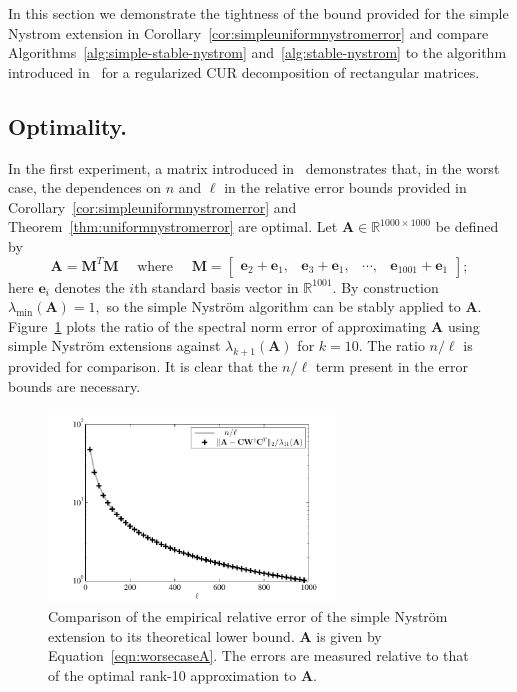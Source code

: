 \documentclass[11pt,letterpaper,twoside,reqno,nosumlimits]{amsart}
\def\transp{T}
\newcommand{\mat}[1]{\ensuremath{\mathbf{#1}}}
\renewcommand{\vec}[1]{\ensuremath{\mathbf{#1}}}
\newcommand{\R}{\ensuremath{\mathbb{R}}}
\newcommand{\lambdamin}[1]{\ensuremath{\lambda_{\mathrm{min}}\left(#1\right)}}
\theoremstyle{remark}
\begin{document}
In this section we demonstrate the tightness of the bound provided for the simple Nystrom extension in Corollary~\ref{cor:simpleuniformnystromerror} and compare Algorithms~\ref{alg:simple-stable-nystrom} and~\ref{alg:stable-nystrom} to the algorithm introduced in~\cite{CD11} for a regularized CUR decomposition of rectangular matrices. 

\subsection*{Optimality.}
In the first experiment, a matrix introduced in~\cite{BDM11} demonstrates that, in the worst case, the dependences on $n$ and $\ell$ in the relative error bounds provided in Corollary~\ref{cor:simpleuniformnystromerror} and Theorem~\ref{thm:uniformnystromerror} are optimal.
Let $\mat{A} \in \R^{1000 \times 1000}$ be defined by
\begin{equation}
\mat{A} = \mat{M}^\transp \mat{M} \quad \text{ where } \quad 
 \mat{M} = [\begin{matrix} \vec{e}_2 + \vec{e}_1, & \vec{e}_3 + \vec{e}_1, & \cdots, & \vec{e}_{1001} + \vec{e}_1 \end{matrix}];
 \label{eqn:worsecaseA}
\end{equation}
here $\vec{e}_i$ denotes the $i$th standard basis vector in $\R^{1001}.$ By construction $\lambdamin{\mat{A}} = 1,$ so the simple Nystr\"om algorithm can be stably applied to $\mat{A}.$
Figure~\ref{fig:optimality} plots the ratio of the spectral norm error of approximating $\mat{A}$ using simple Nystr\"om extensions against $\lambda_{k+1}(\mat{A})$ for $k= 10.$ The ratio $n/\ell$ is provided for comparison. It is clear that the $n/\ell$ term present in the error bounds are necessary.

\begin{figure}[ht!]
 \centering
 \includegraphics[width=3in,keepaspectratio=true]{./experiments/optimalityverification.pdf}
 \caption{Comparison of the empirical relative error of the simple Nystr\"om extension to its theoretical lower bound. $\mat{A}$ is given by Equation~\ref{eqn:worsecaseA}. The errors are measured relative to that of the optimal rank-10 approximation to $\mat{A}.$}
 \label{fig:optimality}
\end{figure}
\end{document}
